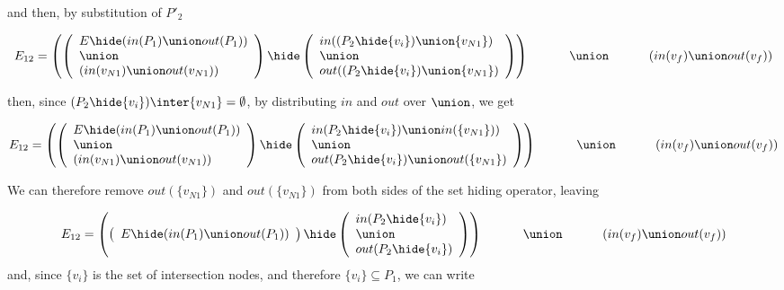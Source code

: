\noindent
and then, by substitution of $P'_2$

\[
E_{12}  =  \left( \left(
  \begin{array}{l}
    E\hide(in(P_1) \union out(P_1)) \\  \union \\ (in(v_{N1}) \union out(v_{N1}) ) \\
  \end{array} \right)
   \hide
   \left( \begin{array}{l}
     in((P_2\hide\{v_i\})\union\{v_{N1}\}) \\\union\\ out((P_2\hide\{v_i\})\union\{v_{N1}\})
   \end{array}
   \right) \right) \\
   \hphantom{E_{12}  = \;\; }   \union\ \\
\hphantom{E_{12}  = \;\;}   (in(v_f) \union out(v_f))\\ 
\]

\noindent
then, since $(P_2\hide\{v_i\}) \inter \{v_{N1}\} = \emptyset$, by distributing $in$ and $out$ over $\union$, we get  

\[
E_{12}  =  \left( \left(
  \begin{array}{l}
    E\hide(in(P_1) \union out(P_1)) \\  \union \\ (in(v_{N1}) \union out(v_{N1}) ) \\
  \end{array} \right)
   \hide
   \left( \begin{array}{l}
     in(P_2\hide\{v_i\})\union in(\{v_{N1}\})) \\\union\\ out(P_2\hide\{v_i\})\union out(\{v_{N1}\})
   \end{array}
   \right) \right) \\
   \hphantom{E_{12}  = \;\; }   \union\ \\
\hphantom{E_{12}  = \;\;}   (in(v_f) \union out(v_f))\\ 
\]

\noindent
We can therefore remove $out(\{v_{N1}\})$ and $out(\{v_{N1}\})$ from both sides of the set hiding operator, leaving 

\[
E_{12}  =  \left( \left(
  \begin{array}{l}
    E\hide(in(P_1) \union out(P_1)) \\  
  \end{array} \right)
   \hide
   \left( \begin{array}{l}
     in(P_2\hide\{v_i\}) \\\union\\ out(P_2\hide\{v_i\})
   \end{array}
   \right) \right) \\
   \hphantom{E_{12}  = \;\; }   \union\ \\
\hphantom{E_{12}  = \;\;}   (in(v_f) \union out(v_f))\\ 
\]
\noindent
and, since $\{v_i\}$ is the set of intersection nodes, and therefore $\{v_i\} \subseteq P_1$, we can write

